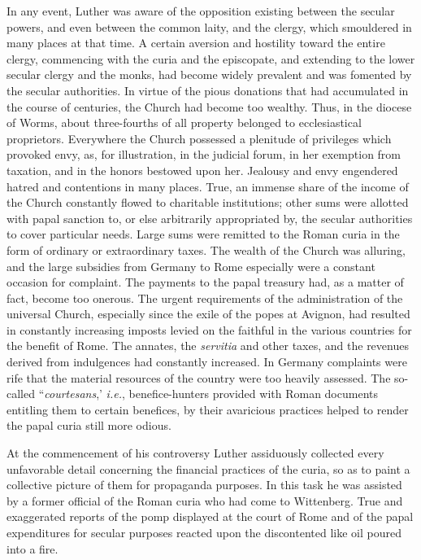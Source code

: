 In any event, Luther was aware of the opposition existing between the
secular powers, and even between the common laity, and the clergy, which
smouldered in many places at that time. A certain
aversion and hostility toward the entire clergy, commencing with
the curia and the episcopate, and extending to the lower secular
clergy and the monks, had become widely prevalent and was fomented by
the secular authorities. In virtue of the pious donations
that had accumulated in the course of centuries, the Church had
become too wealthy. Thus, in the diocese of Worms, about three-fourths
of all property belonged to ecclesiastical proprietors. Everywhere the
Church possessed a plenitude of privileges which provoked
envy, as, for illustration, in the judicial forum, in her exemption
from taxation, and in the honors bestowed upon her. Jealousy and
envy engendered hatred and contentions in many places. True, an
immense share of the income of the Church constantly flowed to
charitable institutions; other sums were allotted with papal
sanction to, or else arbitrarily appropriated by, the secular authorities to
cover particular needs. Large sums were remitted to the Roman
curia in the form of ordinary or extraordinary taxes. The wealth of
the Church was alluring, and the large subsidies from Germany to
Rome especially were a constant occasion for complaint. The payments to
the papal treasury had, as a matter of fact, become too
onerous. The urgent requirements of the administration of the universal
Church, especially since the exile of the popes at Avignon,
had resulted in constantly increasing imposts levied on the faithful in
the various countries for the benefit of Rome. The annates,
the \textit{servitia} and other taxes, and the revenues derived from indulgences
had constantly increased. In Germany complaints were rife that
the material resources of the country were too heavily assessed. The
so-called “\textit{courtesans},’ \textit{i.e.}, benefice-hunters provided with Roman
documents entitling them to certain benefices, by their avaricious
practices helped to render the papal curia still more odious.

At the commencement of his controversy Luther assiduously collected
every unfavorable detail concerning the financial practices
of the curia, so as to paint a collective picture of them for propaganda
purposes. In this task he was assisted by a former official of the
Roman curia who had come to Wittenberg. True and exaggerated
reports of the pomp displayed at the court of Rome and of the papal
expenditures for secular purposes reacted upon the discontented
like oil poured into a fire.

